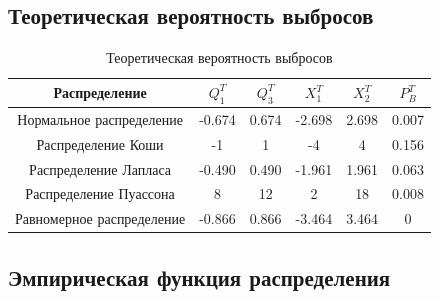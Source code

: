 \subsection{Теоретическая вероятность выбросов}

\begin{table}[H]
	\begin{center}
		\begin{tabular}{|c|c|c|c|c|c|}
			\hline 
			Распределение & $Q_{1}^{T}$ & $Q_{3}^{T}$ & $X_{1}^{T}$ & $X_{2}^{T}$ & $P_{B}^{T}$ \\
			\hline\hline 
			 Нормальное распределение & -0.674 & 0.674  & -2.698  & 2.698 & 0.007\\
			\hline
			 Распределение Коши & -1 & 1 &-4  &4 &0.156\\
			\hline
			 Распределение Лапласа & -0.490 & 0.490 &-1.961  &1.961 &0.063\\
			\hline
			 Распределение Пуассона &8 &12  &2  &18 & 0.008 \\
			\hline
			 Равномерное распределение &-0.866 &0.866  &-3.464  &3.464 &0\\
			\hline
		\end{tabular}
	\end{center}
    \caption{Теоретическая вероятность выбросов}
\end{table}

\subsection{Эмпирическая функция распределения}

